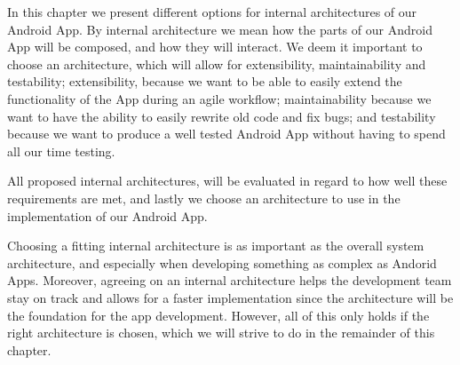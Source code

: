In this chapter we present different options for internal architectures of our Android App.
By internal architecture we mean how the parts of our Android App will be composed, and how they will interact.
We deem it important to choose an architecture, which will allow for extensibility, maintainability and testability;
extensibility, because we want to be able to easily extend the functionality of the App during an agile workflow;
maintainability because we want to have the ability to easily rewrite old code and fix bugs;
and testability because we want to produce a well tested Android App without having to spend all our time testing.

All proposed internal architectures, will be evaluated in regard to how well these requirements are met, and lastly we choose an architecture to use in the implementation of our Android App.

Choosing a fitting internal architecture is as important as the overall system architecture, and especially when developing something as complex as Andorid Apps.
Moreover, agreeing on an internal architecture helps the development team stay on track and allows for a faster implementation since the architecture will be the foundation for the app development.
However, all of this only holds if the right architecture is chosen, which we will strive to do in the remainder of this chapter.

